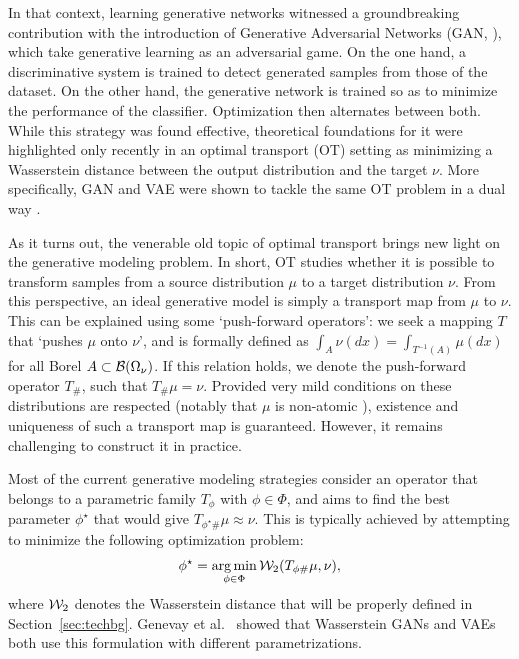 In that context, learning generative networks witnessed a groundbreaking contribution with the introduction of Generative Adversarial Networks (GAN, \cite{goodfellow2014generative,salimans2016improved,eghbal2017probabilistic}), which take generative learning as an adversarial game. On the one hand, a discriminative system is trained to detect generated samples from those of the dataset. On the other hand, the generative network is trained so as to minimize the performance of the classifier. Optimization then alternates between both. While this strategy was found effective, theoretical foundations for it were highlighted only recently \cite{bousquet2017optimal} in an optimal transport (OT) setting as minimizing a Wasserstein distance between the output distribution and the target $\nu$. More specifically, GAN and VAE were shown to tackle the same OT problem in a dual way \cite{bousquet2017optimal,genevay2017gan}.

As it turns out, the venerable old topic of optimal transport brings new light on the generative modeling problem. In short, OT studies whether it is possible to transform samples from a source distribution $\mu$ to a target distribution $\nu$. From this perspective, an ideal generative model is simply a transport map from $\mu$ to $\nu$.  
%
This can be explained using some `push-forward operators': we seek a mapping $T$ that `pushes $\mu$ onto $\nu$', and is formally defined as $\int_A \nu(dx) = \int_{T^{-1}(A)} \mu(dx) $ for all Borel $A \subset {\cal B}(\Omega_\nu)$. If this relation holds, we denote the push-forward operator $T_\#$, such that $T_\# \mu = \nu$. Provided very mild conditions on these distributions are respected (notably that $\mu$ is non-atomic \cite{villani2008optimal}), existence and uniqueness of such a transport map is guaranteed. However, it remains challenging to construct it in practice.

Most of the current generative modeling strategies consider an operator that belongs to a parametric family $T_{\phi}$ with $\phi \in \Phi$, and aims to find the best parameter $\phi^\star$ that would give $T_{\phi^\star \#}\mu \approx \nu$. This is typically achieved by attempting to minimize the following optimization problem:
\begin{align}
\phi^\star = \operatorname*{arg\min}_{\phi \in \Phi} {\cal W}_2(T_{\phi \#}\mu, \nu),
\end{align}
where ${\cal W}_2$ denotes the Wasserstein distance that will be properly defined in Section~\ref{sec:techbg}. Genevay et al.\ \cite{genevay2017gan} showed that Wasserstein GANs and VAEs both use this formulation with different parametrizations. 

